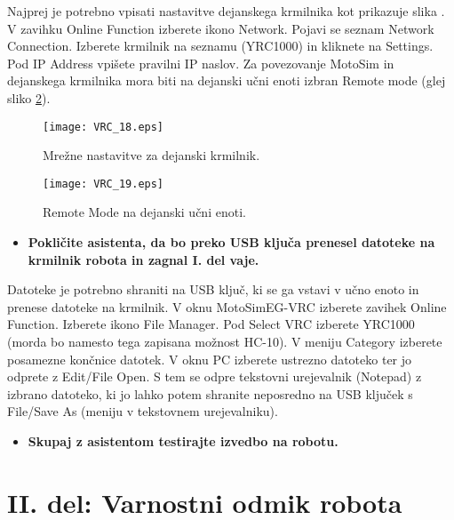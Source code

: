 Najprej je potrebno vpisati nastavitve dejanskega krmilnika kot prikazuje slika . V zavihku Online Function izberete ikono Network. Pojavi se seznam Network Connection. Izberete krmilnik na seznamu (YRC1000) in kliknete na Settings. Pod IP Address vpišete pravilni IP naslov. Za povezovanje MotoSim in dejanskega krmilnika mora biti na dejanski učni enoti izbran Remote mode (glej sliko \ref{fig:VRC_19}).

\begin{figure}[hbt]
	\centering
	\texttt{[image: VRC\_18.eps]}
	\caption{Mrežne nastavitve za dejanski krmilnik.}
	\label{fig:VRC_18}
\end{figure}

\begin{figure}[hbt]
	\centering
	\texttt{[image: VRC\_19.eps]}
	\caption{Remote Mode na dejanski učni enoti.}
	\label{fig:VRC_19}
\end{figure}

\begin{mdframed}[backgroundcolor=red!20, shadow=true,roundcorner=8pt]
	\begin{itemize}
		\item \textbf{Pokličite asistenta, da bo preko USB ključa prenesel datoteke na krmilnik robota in zagnal I. del vaje.}
	\end{itemize}
\end{mdframed}
	
Datoteke je potrebno shraniti na USB ključ, ki se ga vstavi v učno enoto in prenese datoteke na krmilnik. V oknu MotoSimEG-VRC izberete zavihek Online Function. Izberete ikono File Manager. Pod Select VRC izberete YRC1000 (morda bo namesto tega zapisana možnost HC-10). V meniju Category izberete posamezne končnice datotek. V oknu PC izberete ustrezno datoteko ter jo odprete z Edit/File Open. S tem se odpre tekstovni urejevalnik (Notepad) z izbrano datoteko, ki jo lahko potem shranite neposredno na USB ključek s File/Save As (meniju v tekstovnem urejevalniku).


\begin{mdframed}[backgroundcolor=red!20, shadow=true,roundcorner=8pt]
	\begin{itemize}
		\item \textbf{Skupaj z asistentom testirajte izvedbo na robotu.}
	\end{itemize}
\end{mdframed}

\section{II. del: Varnostni odmik robota} \label{poglavje2del_vaje}


